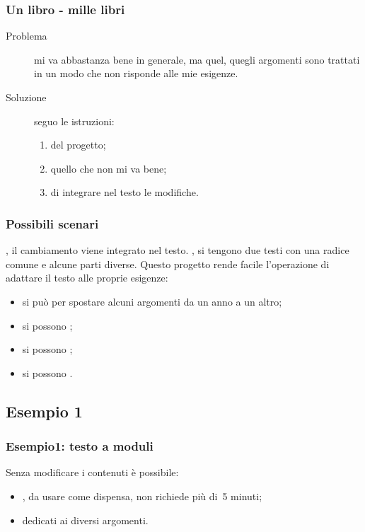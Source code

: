 \documentclass{beamer} %
\begin{document}
\begin{frame}\frametitle{Un libro - mille libri}

\begin{description}
\item [Problema ] mi va abbastanza bene in generale, ma quel, quegli 
argomenti sono trattati in un modo che non risponde alle mie esigenze.
\item [Soluzione ] seguo le istruzioni:
\begin{enumerate} [<+->]
\item {} del progetto;
\item {} quello che non mi va bene;
\item {} di integrare nel testo le modifiche.
\end{enumerate}
\end{description}

\end{frame}


\begin{frame}\frametitle{Possibili scenari}

, 
il cambiamento viene integrato nel testo.
\spause
{}, 
si tengono due testi con una radice comune e alcune parti diverse.
\spause
Questo progetto rende facile l'operazione di adattare il testo alle proprie 
esigenze:
\begin{itemize} %
\item si può  
per spostare alcuni argomenti da un anno a un altro;
\item si possono ;
\item si possono ;
\item si possono .
\end{itemize}

\end{frame}


\subsection{Esempio 1}


\begin{frame}\frametitle{Esempio1: testo a moduli}

Senza modificare i contenuti è possibile:
\begin{itemize} 
\item {}, da usare come dispensa, 
non richiede più di~5 minuti;
\item {} dedicati ai diversi 
argomenti.
\end{itemize}

\end{frame}
\end{document}
